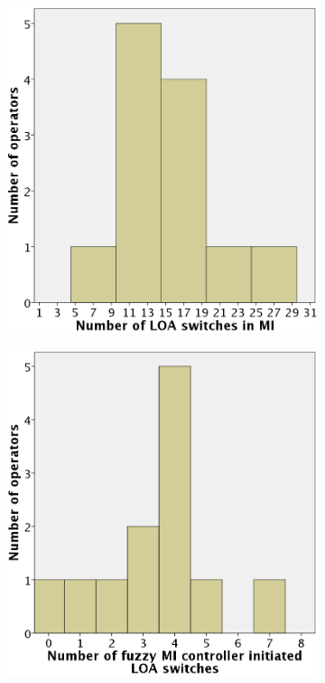 \documentclass[a4paper,12pt,oneside,openright]{bhamthesis}
\begin{document}
	\begin{figure}
		\centering
		\begin{subfigure}[b]{0.45\textwidth}
			\centering
			\includegraphics[width=\textwidth]{chapter5_fig/histogram_loa_mi_exp3.png}
			\caption{}
			\label{subfig:histogram_lao_mi_exp3}
		\end{subfigure}
		\hfill
		\begin{subfigure}[b]{0.45\textwidth}
			\centering
			\includegraphics[width=\textwidth]{chapter5_fig/histogram_loa_mi_ai_exp3.png}

\end{subfigure}
\end{figure}
\end{document}
